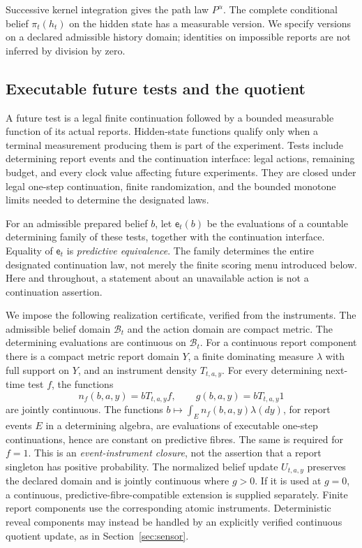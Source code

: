 Successive kernel integration gives the path law $P^\alpha$. The complete conditional belief $\pi_t(h_t)$ on the hidden state has a measurable version. We specify versions on a declared admissible history domain; identities on impossible reports are not inferred by division by zero.

\subsection{Executable future tests and the quotient}
A future test is a legal finite continuation followed by a bounded measurable function of its actual reports. Hidden-state functions qualify only when a terminal measurement producing them is part of the experiment. Tests include determining report events and the continuation interface: legal actions, remaining budget, and every clock value affecting future experiments. They are closed under legal one-step continuation, finite randomization, and the bounded monotone limits needed to determine the designated laws.

For an admissible prepared belief $b$, let $\mathsf e_t(b)$ be the evaluations of a countable determining family of these tests, together with the continuation interface. Equality of $\mathsf e_t$ is \emph{predictive equivalence}. The family determines the entire designated continuation law, not merely the finite scoring menu introduced below. Here and throughout, a statement about an unavailable action is not a continuation assertion.

We impose the following realization certificate, verified from the instruments. The admissible belief domain $\mathcal B_t$ and the action domain are compact metric. The determining evaluations are continuous on $\mathcal B_t$. For a continuous report component there is a compact metric report domain $Y$, a finite dominating measure $\lambda$ with full support on $Y$, and an instrument density $T_{t,a,y}$. For every determining next-time test $f$, the functions
\begin{equation}\label{eq:density-pullback}
 n_f(b,a,y)=bT_{t,a,y}f,\qquad g(b,a,y)=bT_{t,a,y}1
\end{equation}
are jointly continuous. The functions $b\mapsto\int_E n_f(b,a,y)\lambda(dy)$, for report events $E$ in a determining algebra, are evaluations of executable one-step continuations, hence are constant on predictive fibres. The same is required for $f=1$. This is an \emph{event-instrument closure}, not the assertion that a report singleton has positive probability. The normalized belief update $U_{t,a,y}$ preserves the declared domain and is jointly continuous where $g>0$. If it is used at $g=0$, a continuous, predictive-fibre-compatible extension is supplied separately. Finite report components use the corresponding atomic instruments. Deterministic reveal components may instead be handled by an explicitly verified continuous quotient update, as in Section~\ref{sec:sensor}.

